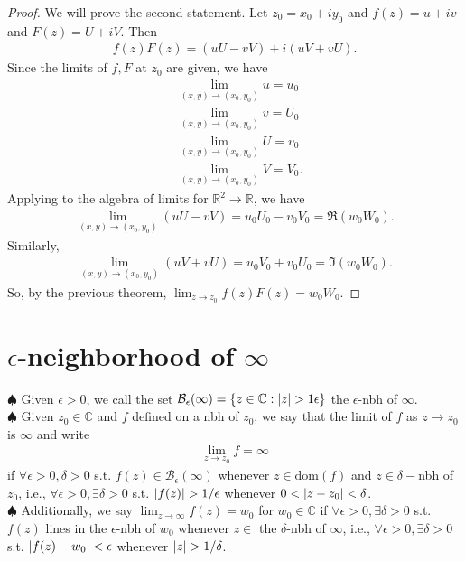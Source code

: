 \documentclass{article}
\theoremstyle{definition}
\newcommand{\R}{\mathbb{R}}
\newcommand{\C}{\mathbb{C}}
\newcommand{\B}{\mathcal{B}}
\newcommand{\nn}{\nonumber}
\begin{document}
\begin{proof}
	We will prove the second statement. Let $z_0 = x_0 + iy_0$ and $f(z) = u + iv$ and $F(z) = U + iV$. Then
	\begin{align}
	f(z) F(z) = (uU - vV) + i (uV + vU).
	\end{align}
	Since the limits of $f,F$ at $z_0$ are given, we have
	\begin{align}
	&\lim_{(x,y)\to(x_0,y_0)} u = u_0\nn\\
	&\lim_{(x,y)\to(x_0,y_0)} v = U_0\nn\\
	&\lim_{(x,y)\to(x_0,y_0)} U = v_0\nn\\
	&\lim_{(x,y)\to(x_0,y_0)} V = V_0.
	\end{align} 
	Applying to the algebra of limits for $\R^2 \to \R$, we have
	\begin{align}
	\lim_{(x,y)\to(x_0,y_0)} (uU - vV) = u_0 U_0 - v_0V_0 = \Re(w_0 W_0).
	\end{align}
	Similarly,
	\begin{align}
	\lim_{(x,y)\to(x_0,y_0)} (uV + vU) = u_0 V_0 + v_0U_0 = \Im(w_0 W_0).
	\end{align}
	So, by the previous theorem, $\lim_{z \to z_0} f(z)F(z) = w_0W_0$.
\end{proof}




\section{$\epsilon$-neighborhood of $\infty$}


\noindent $\spadesuit$ Given $\epsilon> 0$, we call the set $\B_\epsilon(\infty) = \{ z \in \C : \abs{z} > 1\epsilon \}$ the $\epsilon$-nbh of $\infty$. \\

\noindent $\spadesuit$ Given $z_0 \in \C$ and $f$ defined on a nbh of $z_0$, we say that the limit of $f$ as $z\to z_0$ is $\infty$ and write
\begin{align}
\lim_{z \to z_0} f = \infty
\end{align}
if $\forall \epsilon > 0, \delta > 0$ s.t. $f(z) \in \B_\epsilon(\infty)$ whenever $z \in \text{dom}(f)$ and $z\in \delta-$nbh of $z_0$, i.e., $\forall \epsilon > 0, \exists \delta>0$ s.t. $\abs{f(z)} > 1/\epsilon$ whenever $0 < \abs{z-z_0} < \delta$.\\

\noindent $\spadesuit$ Additionally, we say $\lim_{z\to\infty} f(z) = w_0$ for $w_0 \in \C$ if $\forall \epsilon > 0,\exists \delta >0 $ s.t. $f(z)$ lines in the $\epsilon$-nbh of $w_0$ whenever $z\in$ the $\delta$-nbh of $\infty$, i.e., $\forall \epsilon > 0, \exists \delta >0 $ s.t. $\abs{f(z) - w_0} < \epsilon$ whenever $\abs{z} > 1/\delta$.\\
\end{document}
